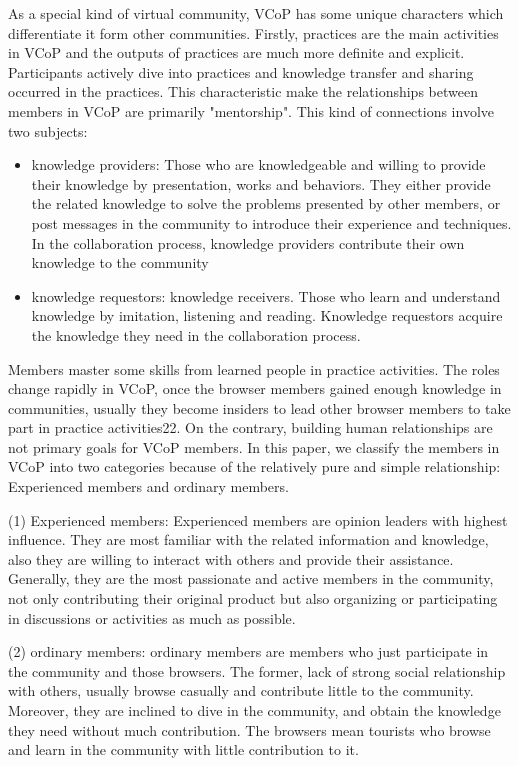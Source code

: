 \documentclass{elsarticle}
\begin{document}
As a special kind of virtual community, VCoP has some unique
characters which differentiate it form other communities. Firstly,
practices are the main activities in VCoP and the outputs of practices
are much more definite and explicit. Participants actively dive into
practices and knowledge transfer and sharing occurred in the
practices. This characteristic make the relationships between members
in VCoP are primarily "mentorship". This kind of connections involve
two subjects:
\begin{itemize}
\item  knowledge providers: Those who are knowledgeable and willing to
  provide their knowledge by presentation, works and behaviors. They
  either provide the related knowledge to solve the problems presented
  by other members, or post messages in the community to introduce
  their experience and techniques. In the collaboration process,
  knowledge providers contribute their own knowledge to the community
\item  knowledge requestors: knowledge receivers. Those who learn and understand knowledge by imitation, listening and reading. Knowledge requestors acquire the knowledge they need in the collaboration process.
\end{itemize}
Members master some skills from
learned people in practice activities. The roles change rapidly in
VCoP, once the browser members gained enough knowledge in communities,
usually they become insiders to lead other browser members to take
part in practice activities22. On the contrary, building human
relationships are not primary goals for VCoP members.  In this paper,
we classify the members in VCoP into two categories because of the
relatively pure and simple relationship:   Experienced members and  ordinary members.

(1)  Experienced members: Experienced members are opinion leaders with highest influence. They are most familiar with the related information and knowledge, also they are willing to interact with others and provide their assistance. Generally, they are the most passionate and active members in the community, not only contributing their original product but also organizing or participating in discussions or activities as much as possible. 

(2)  ordinary members: ordinary members are members who just
participate in the community and those browsers. The former, lack of
strong social relationship with others, usually browse casually and
contribute little to the community. Moreover, they are inclined to
dive in the community, and obtain the knowledge they need without much
contribution. The browsers mean tourists who browse and learn in the
community with little contribution to it. 
\end{document}
